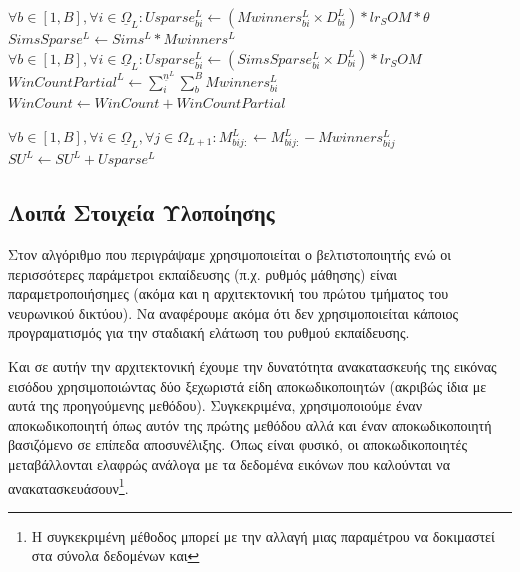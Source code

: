 {\begin{algorithm}
\begin{algorithmic}
              \State $\forall b \in [1,B], \forall i \in \underline{\Omega}_L: Usparse^L_{bi} \gets (Mwinners^L_{bi} \times D^L_{bi}) \ast lr_SOM \ast \theta$
              \State $SimsSparse^L \gets Sims^L \ast Mwinners^L$
              \State $\forall b \in [1,B], \forall i \in \underline{\Omega}_L: Usparse_{bi}^L \gets (SimsSparse^L_{bi} \times D^L_{bi}) \ast lr_SOM$
            \EndIf
            \State {}
              \State $WinCountPartial^L \gets \sum_i^{\underline{n}^L} \sum_b^B Mwinners^L_{bi}$
              \State $WinCount \gets WinCount + WinCountPartial$ 

            \EndIf
              \State $\forall b \in [1,B], \forall i \in \underline{\Omega}_L, \forall j \in \Omega_{L+1}: M^L_{bij:} \gets M^L_{bij:} - Mwinners^L_{bij}$
              \State {}
            \EndIf
            \State {}
            \State $SU^L \gets SU^L + Usparse^L$ 

      \EndFor
    \EndProcedure
  \end{algorithmic}
\end{algorithm}
}
\subsection{Λοιπά Στοιχεία Υλοποίησης}

Στον αλγόριθμο που περιγράψαμε χρησιμοποιείται ο βελτιστοποιητής  ενώ οι περισσότερες παράμετροι εκπαίδευσης (π.χ. ρυθμός μάθησης) είναι παραμετροποιήσημες (ακόμα και η αρχιτεκτονική του πρώτου τμήματος του νευρωνικού δικτύου). Να αναφέρουμε ακόμα ότι δεν χρησιμοποιείται κάποιος προγραματισμός για την σταδιακή ελάτωση του ρυθμού εκπαίδευσης. \par

Και σε αυτήν την αρχιτεκτονική έχουμε την δυνατότητα ανακατασκευής της εικόνας εισόδου χρησιμοποιώντας δύο ξεχωριστά είδη αποκωδικοποιητών (ακριβώς ίδια με αυτά της προηγούμενης μεθόδου). Συγκεκριμένα, χρησιμοποιούμε έναν αποκωδικοποιητή όπως αυτόν της πρώτης μεθόδου αλλά και έναν αποκωδικοποιητή βασιζόμενο σε επίπεδα αποσυνέλιξης. Όπως είναι φυσικό, οι αποκωδικοποιητές μεταβάλλονται ελαφρώς ανάλογα με τα δεδομένα εικόνων που καλούνται να ανακατασκευάσουν\footnote{Η συγκεκριμένη μέθοδος μπορεί με την αλλαγή μιας παραμέτρου να δοκιμαστεί στα σύνολα δεδομένων  και }.\par

